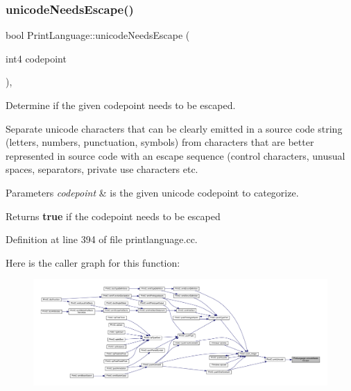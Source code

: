 \subsubsection{\texorpdfstring{unicodeNeedsEscape()}{unicodeNeedsEscape()}}
{\footnotesize\ttfamily bool Print\+Language\+::unicode\+Needs\+Escape (\begin{DoxyParamCaption}\item[{int4}]{codepoint }\end{DoxyParamCaption})\hspace{0.3cm}{\ttfamily [static]}, {\ttfamily [protected]}}



Determine if the given codepoint needs to be escaped. 

Separate unicode characters that can be clearly emitted in a source code string (letters, numbers, punctuation, symbols) from characters that are better represented in source code with an escape sequence (control characters, unusual spaces, separators, private use characters etc. 
\begin{DoxyParams}{Parameters}
{\em codepoint} & is the given unicode codepoint to categorize. \\
\hline
\end{DoxyParams}
\begin{DoxyReturn}{Returns}
{\bfseries{true}} if the codepoint needs to be escaped 
\end{DoxyReturn}


Definition at line 394 of file printlanguage.\+cc.

Here is the caller graph for this function\+:
\nopagebreak
\begin{figure}[H]
\begin{center}
\leavevmode
\includegraphics[width=350pt]{class_print_language_a4438c48a32bb84170fe5736e4f13267b_icgraph}
\end{center}
\end{figure}
\mbox{\label{class_print_language_a5cb6bbf5e82586e921fea96051b7123b}} 
